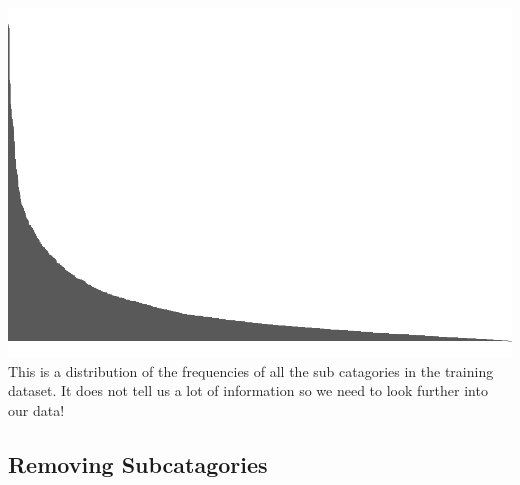 \documentclass[]{article}
\begin{document}
\includegraphics{Final-Report_files/figure-latex/initial-graph-1.pdf}
This is a distribution of the frequencies of all the sub catagories in
the training dataset. It does not tell us a lot of information so we
need to look further into our data!

\hypertarget{removing-subcatagories}{%
\subsection{Removing Subcatagories}\label{removing-subcatagories}}
\end{document}
